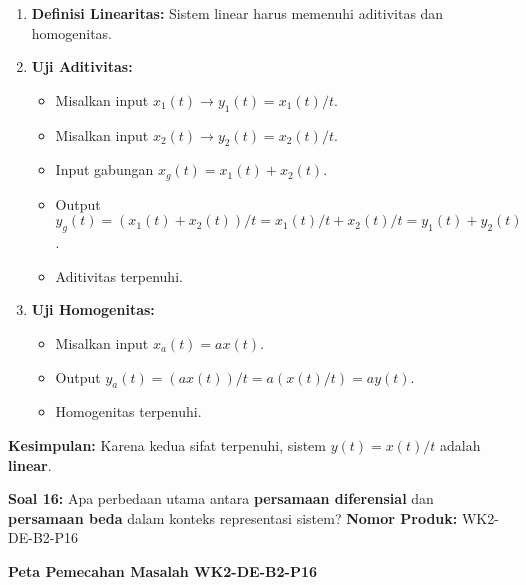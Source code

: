 \documentclass[
  letterpaper,
  DIV=11,
  numbers=noendperiod]{scrreprt}
\providecommand{\tightlist}{%
  \setlength{\itemsep}{0pt}\setlength{\parskip}{0pt}}
\begin{document}
\begin{enumerate}
\def\labelenumi{\arabic{enumi}.}
\tightlist
\item
  \textbf{Definisi Linearitas:} Sistem linear harus memenuhi aditivitas
  dan homogenitas.
\item
  \textbf{Uji Aditivitas:}

  \begin{itemize}
  \tightlist
  \item
    Misalkan input \(x_1(t) \rightarrow y_1(t) = x_1(t)/t\).
  \item
    Misalkan input \(x_2(t) \rightarrow y_2(t) = x_2(t)/t\).
  \item
    Input gabungan \(x_g(t) = x_1(t) + x_2(t)\).
  \item
    Output
    \(y_g(t) = (x_1(t) + x_2(t))/t = x_1(t)/t + x_2(t)/t = y_1(t) + y_2(t)\).
  \item
    Aditivitas terpenuhi.
  \end{itemize}
\item
  \textbf{Uji Homogenitas:}

  \begin{itemize}
  \tightlist
  \item
    Misalkan input \(x_a(t) = a x(t)\).
  \item
    Output \(y_a(t) = (a x(t))/t = a (x(t)/t) = a y(t)\).
  \item
    Homogenitas terpenuhi.
  \end{itemize}
\end{enumerate}

\textbf{Kesimpulan:} Karena kedua sifat terpenuhi, sistem
\(y(t) = x(t)/t\) adalah \textbf{linear}.

\textbf{Soal 16:} Apa perbedaan utama antara \textbf{persamaan
diferensial} dan \textbf{persamaan beda} dalam konteks representasi
sistem? \textbf{Nomor Produk:} WK2-DE-B2-P16

\textbf{Peta Pemecahan Masalah WK2-DE-B2-P16}
\end{document}
